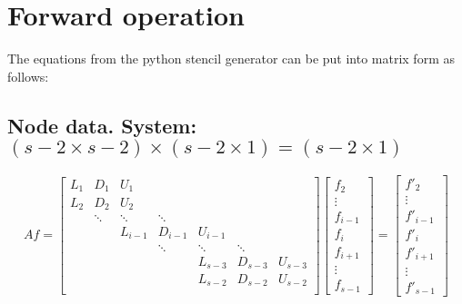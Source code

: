 \documentclass[11pt]{article}
\begin{document}
\doublespacing
\MOONSTITLE

\section{Forward operation}
The equations from the python stencil generator can be put into matrix form as follows:

\subsection{Node data. System:
\texorpdfstring{$ (s-2 \times s-2) \times (s-2 \times 1) = (s-2 \times 1)$}{}}
\[ Af = \left[
\begin{array}{ccccccccc}
L_{1} & D_{1}    & U_{1}     &           &           &           &         \\
L_{2} & D_{2}    & U_{2}     &           &           &           &         \\
      & \ddots   & \ddots    & \ddots    &           &           &         \\
      &          & L_{i-1}   & D_{i-1}   & U_{i-1}   &           &         \\
      &          &           & \ddots    & \ddots    & \ddots    &         \\
      &          &           &           & L_{s-3}   & D_{s-3}   & U_{s-3} \\
      &          &           &           & L_{s-2}   & D_{s-2}   & U_{s-2} \\
\end{array} \right]
\left[ \begin{array}{c}
f_{2} \\ \vdots \\ f_{i-1} \\ f_{i} \\ f_{i+1} \\ \vdots \\ f_{s-1}
\end{array} \right]
=
\left[ \begin{array}{c}
f'_{2} \\ \vdots \\ f'_{i-1} \\ f'_{i} \\ f'_{i+1} \\ \vdots \\ f'_{s-1}
\end{array} \right]
\]
\end{document}
